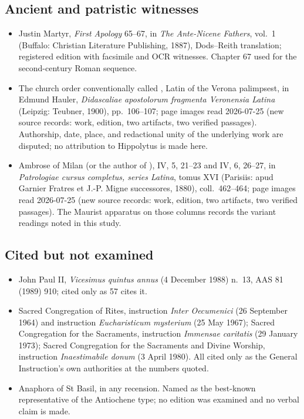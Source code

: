 \subsection*{Ancient and patristic witnesses}

{\fontsize{8.6}{9.6}\selectfont
\begin{itemize}[itemsep=0pt,parsep=0pt,topsep=0.05em]
\item Justin Martyr, \emph{First Apology} 65--67, in \emph{The Ante-Nicene Fathers}, vol.\ 1
(Buffalo: Christian Literature Publishing, 1887), Dods--Reith translation; registered edition
with facsimile and OCR witnesses. Chapter 67 used for the second-century Roman sequence.
\item The church order conventionally called , Latin of the Verona
palimpsest, in Edmund Hauler, \emph{Didascaliae apostolorum fragmenta Veronensia Latina}
(Leipzig: Teubner, 1900), pp.\ 106--107; page images read 2026-07-25 (new source records:
work, edition, two artifacts, two verified passages). Authorship, date, place, and redactional
unity of the underlying work are disputed; no attribution to Hippolytus is made here.
\item Ambrose of Milan (or the author of ),  IV, 5,
21--23 and IV, 6, 26--27, in \emph{Patrologiae cursus completus, series Latina}, tomus XVI
(Parisiis: apud Garnier Fratres et J.-P. Migne successores, 1880), coll.\ 462--464; page images
read 2026-07-25 (new source records: work, edition, two artifacts, two verified passages). The
Maurist apparatus on those columns records the variant readings noted in this study.
\end{itemize}}

\subsection*{Cited but not examined}

{\fontsize{8.6}{9.6}\selectfont
\begin{itemize}[itemsep=0pt,parsep=0pt,topsep=0.05em]
\item John Paul II, \emph{Vicesimus quintus annus} (4 December 1988) n.\ 13, AAS 81 (1989) 910;
cited only as  57 cites it.
\item Sacred Congregation of Rites, instruction \emph{Inter Oecumenici} (26 September 1964) and
instruction \emph{Eucharisticum mysterium} (25 May 1967); Sacred Congregation for the Sacraments,
instruction \emph{Immensae caritatis} (29 January 1973); Sacred Congregation for the Sacraments
and Divine Worship, instruction \emph{Inaestimabile donum} (3 April 1980). All cited only as the
General Instruction's own authorities at the numbers quoted.
\item Anaphora of St Basil, in any recension. Named as the best-known representative of the
Antiochene type; no edition was examined and no verbal claim is made.
\end{itemize}}

\endgroup
